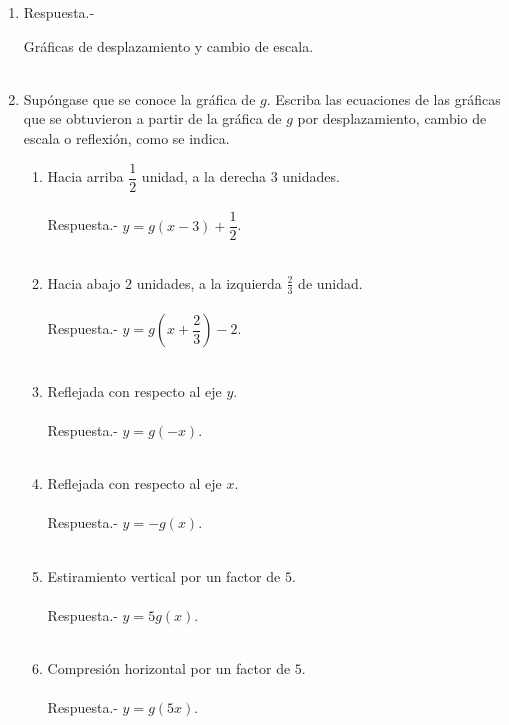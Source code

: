 \begin{enumerate}
\item Respuesta.-\;

Gráficas de desplazamiento y cambio de escala.\\\\

\item Supóngase que se conoce la gráfica de $g$. Escriba las ecuaciones de las gráficas que se obtuvieron a partir de la gráfica de $g$ por desplazamiento, cambio de escala o reflexión, como se indica.
\begin{enumerate}[\bfseries a)]

    \item Hacia arriba $\dfrac{1}{2}$ unidad, a la derecha $3$ unidades.\\\\
	Respuesta.-\; $y = g(x-3) + \dfrac{1}{2}$.\\\\

    \item Hacia abajo $2$ unidades, a la izquierda $\frac{2}{3}$ de unidad.\\\\
	Respuesta.-\; $y = g(x+\dfrac{2}{3}) - 2$.\\\\

    \item Reflejada con respecto al eje $y$.\\\\ 
	Respuesta.-\; $y = g(-x)$.\\\\

    \item Reflejada con respecto al eje $x$.\\\\ 
	Respuesta.-\; $y = -g(x)$.\\\\ 

    \item Estiramiento vertical por un factor de $5$.\\\\
	Respuesta.-\; $y = 5g(x)$.\\\\

    \item Compresión horizontal por un factor de $5$.\\\\
	Respuesta.-\; $y = g(5x)$.\\\\


\end{enumerate}
\end{enumerate}
